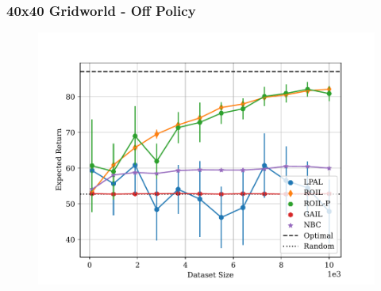 \documentclass{beamer}
\begin{document}
\begin{frame}
\frametitle{40x40 Gridworld - Off Policy}
\begin{figure}
    \centering
    \includegraphics[width=\linewidth]{plots/returns/40x40_gridworld_off_policy_returns.pdf}
\end{figure}
\end{frame}
\end{document}
